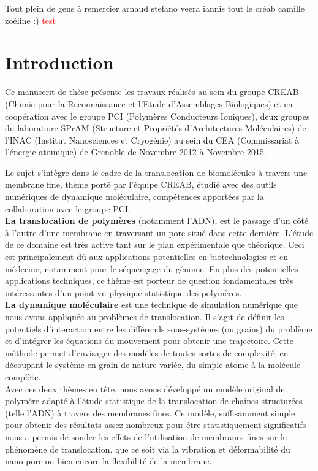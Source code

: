 \documentclass[a4paper,11pt]{article}
\begin{document}
Tout plein de gens à remercier
arnaud stefano veera iannis tout le créab camille zoéline :)
\textcolor{red}{test}

\newpage

\section*{Introduction}

Ce manuscrit de thèse présente les travaux réalisés au sein du groupe CREAB (Chimie pour la Reconnaissance et l’Etude d’Assemblages Biologiques) et en coopération avec le groupe PCI (Polymères Conducteurs Ioniques), deux groupes du laboratoire SPrAM (Structure et Propriétés d'Architectures Moléculaires) de l'INAC (Institut Nanosciences et Cryogénie) au sein du CEA (Commissariat à l'énergie atomique) de Grenoble de Novembre 2012 à Novembre 2015.

Le sujet s'intègre dans le cadre de la translocation de biomolécules à travers une membrane fine, thème porté par l'équipe CREAB, étudié avec des outils numériques de dynamique moléculaire, compétences apportées par la collaboration avec le groupe PCI. \\

\textbf{La translocation de polymères} (notamment l'ADN), est le passage d'un c\^{o}té à l'autre d'une membrane en traversant un pore situé dans cette dernière. L'étude de ce domaine est très active tant sur le plan expérimentale que théorique. Ceci est principalement d\^{u} aux applications potentielles en biotechnologies et en médecine, notamment pour le séquençage du génome. En plus des potentielles applications techniques, ce thème est porteur de question fondamentales très intéressantes d'un point vu physique statistique des polymères.\\

\textbf{La dynamique moléculaire} est une technique de simulation numérique que nous avons appliquée au problèmes de translocation. Il s'agit de définir les potentiels d'interaction entre les différends sous-systèmes (ou grains) du problème et d'intégrer les équations du mouvement pour obtenir une trajectoire. Cette méthode permet d'envisager des modèles de toutes sortes de complexité, en découpant le système en grain de nature variée, du simple atome à la molécule complète.\\

Avec ces deux thèmes en t\^{e}te, nous avons développé un modèle original de polymère adapté à l'étude statistique de la translocation de cha\^{i}nes structurées (telle l'ADN) à travers des membranes fines. Ce modèle, suffisamment simple pour obtenir des résultats assez nombreux pour \^{e}tre statistiquement significatifs nous a permis de sonder les effets de l'utilisation de membranes fines sur le phénomène de translocation, que ce soit via la vibration et déformabilité du nano-pore ou bien encore la flexibilité de la membrane.\\
\end{document}
